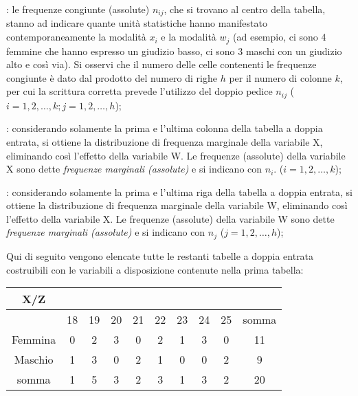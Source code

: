 \begin{description} [noitemsep]
        \item [distribuzione congiunta di X e di W]: 
le frequenze congiunte (assolute) \(n_{ij}\), 
che si trovano al centro della tabella, 
stanno ad indicare quante unità statistiche hanno manifestato 
contemporaneamente la modalità \(x_i\) e la modalità \(w_j\) (ad esempio, ci 
sono 4 femmine che hanno espresso un giudizio basso, ci sono 3 maschi con 
un giudizio alto e così via). Si osservi che il numero delle celle 
contenenti le frequenze congiunte è dato dal prodotto del numero di righe 
\(h\) per il numero di colonne \(k\), per cui la scrittura corretta prevede 
l'utilizzo del doppio pedice \(n_{ij}\) (\(i=1,2,\dots,k; j=1,2,\dots,h\));
        \item [distribuzione marginale di X]: 
considerando solamente 
la prima e l'ultima colonna della tabella a doppia entrata, si ottiene la 
distribuzione di frequenza marginale della variabile X, eliminando così 
l'effetto della variabile W. Le frequenze (assolute) della variabile X sono 
dette \emph{frequenze marginali (assolute)} e si indicano con \(n_i\). 
(\(i=1,2,\dots,k\));
        \item [distribuzione marginale di W]: 
considerando solamente 
la prima e l'ultima riga della tabella a doppia entrata, si ottiene la 
distribuzione di frequenza marginale della variabile W, eliminando così 
l'effetto della variabile X. Le frequenze (assolute) della variabile W sono 
dette \emph{frequenze marginali (assolute)} e si indicano con \(n_j\) 
(\(j=1,2,\dots,h\));
\end{description}

Qui di seguito vengono elencate tutte le restanti tabelle a doppia entrata 
costruibili con le variabili a disposizione contenute nella prima tabella:

\noindent
\begin{tabular}{|c|c|c|c|c|c|c|c|c|c|}
        \hline
X/Z&&&&&&&&&\\ 
\hline
        &18&    19&     20&     21&     22&     23&     24&     25&     
somma\\ 
        \hline
Femmina&        0&      2&      3&      0&      2       &1      &3      
&0      &11\\
\hline
Maschio&        1&      3&      0       &2      &1&     0&      0&      
2&      9\\
\hline
somma & 1&      5&      3&      2&      3&      1&      3       &2      
&20\\
\hline
\end{tabular}

